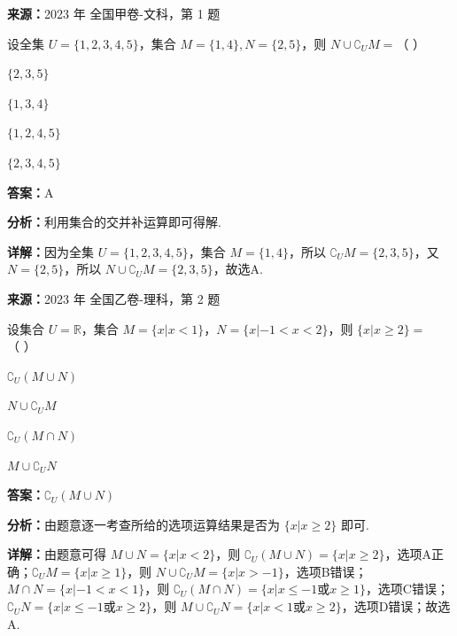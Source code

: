 \begin{question}[points=5]
\textbf{来源：}2023 年 全国甲卷-文科，第 1 题\par
设全集 $U = \{1,2,3,4,5\}$，集合 $M = \{1,4\}, N = \{2,5\}$，则 $N \cup \complement_U M =$（    ）
\begin{choices}
  \item $\{2,3,5\}$
  \item $\{1,3,4\}$
  \item $\{1,2,4,5\}$
  \item $\{2,3,4,5\}$
\end{choices}
\begin{solution}
\textbf{答案：}A

\textbf{分析：}利用集合的交并补运算即可得解.

\textbf{详解：}因为全集 $U = \{1,2,3,4,5\}$，集合 $M = \{1,4\}$，所以 $\complement_U M = \{2,3,5\}$，又 $N = \{2,5\}$，所以 $N \cup \complement_U M = \{2,3,5\}$，故选A.
\end{solution}
\end{question}

\begin{question}[points=5]
\textbf{来源：}2023 年 全国乙卷-理科，第 2 题\par
设集合 $U=\mathbb{R}$，集合 $M=\{x|x<1\}$，$N=\{x|-1<x<2\}$，则 $\{x|x\ge 2\}=$（ ）
\begin{choices}
  \item $\complement_U (M\cup N)$
  \item $N\cup \complement_U M$
  \item $\complement_U (M\cap N)$
  \item $M\cup \complement_U N$
\end{choices}
\begin{solution}
\textbf{答案：}$\complement_U (M\cup N)$

\textbf{分析：}由题意逐一考查所给的选项运算结果是否为 $\{x|x\ge 2\}$ 即可.

\textbf{详解：}由题意可得 $M\cup N=\{x|x<2\}$，则 $\complement_U (M\cup N)=\{x|x\ge 2\}$，选项A正确；$\complement_U M=\{x|x\ge 1\}$，则 $N\cup \complement_U M=\{x|x>-1\}$，选项B错误；$M\cap N=\{x|-1<x<1\}$，则 $\complement_U (M\cap N)=\{x|x\le -1$或$x\ge 1\}$，选项C错误；$\complement_U N=\{x|x\le -1$或$x\ge 2\}$，则 $M\cup \complement_U N=\{x|x<1$或$x\ge 2\}$，选项D错误；故选A.
\end{solution}
\end{question}

